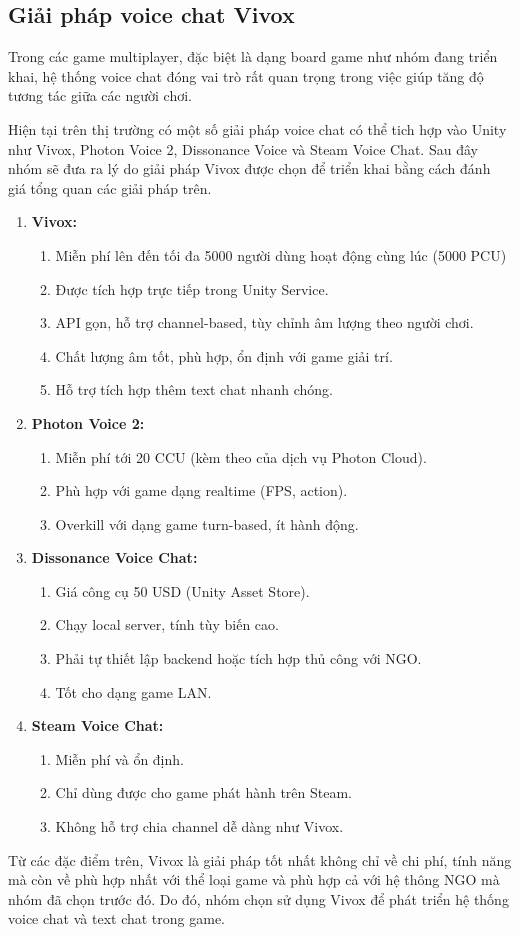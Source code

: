 \subsection{Giải pháp voice chat Vivox}
Trong các game multiplayer, đặc biệt là dạng board game như nhóm đang triển khai, hệ thống voice chat đóng vai trò rất quan trọng trong việc giúp tăng độ tương tác giữa các người chơi.

Hiện tại trên thị trường có một số giải pháp voice chat có thể tich hợp vào Unity như Vivox, Photon Voice 2, Dissonance Voice và Steam Voice Chat. Sau đây nhóm sẽ đưa ra lý do giải pháp Vivox được chọn để triển khai bằng cách đánh giá tổng quan các giải pháp trên.
\begin{enumerate}[$\bullet$]
    \item \textbf{Vivox:}
    \begin{enumerate}[-]
        \item Miễn phí lên đến tối đa 5000 người dùng hoạt động cùng lúc (5000 PCU)
        \item Được tích hợp trực tiếp trong Unity Service.
        \item API gọn, hỗ trợ channel-based, tùy chỉnh âm lượng theo người chơi.
        \item Chất lượng âm tốt, phù hợp, ổn định với game giải trí.
        \item Hỗ trợ tích hợp thêm text chat nhanh chóng.
    \end{enumerate}
    \item \textbf{Photon Voice 2:}
    \begin{enumerate}[-]
        \item Miễn phí tới 20 CCU (kèm theo của dịch vụ Photon Cloud).
        \item Phù hợp với game dạng realtime (FPS, action).
        \item Overkill với dạng game turn-based, ít hành động.
    \end{enumerate}
    \item \textbf{Dissonance Voice Chat:}
    \begin{enumerate}[-]
        \item Giá công cụ 50 USD (Unity Asset Store).
        \item Chạy local server, tính tùy biến cao.
        \item Phải tự thiết lập backend hoặc tích hợp thủ công với NGO.
        \item Tốt cho dạng game LAN.
    \end{enumerate}
    \item \textbf{Steam Voice Chat:}
    \begin{enumerate}[-]
        \item Miễn phí và ổn định.
        \item Chỉ dùng được cho game phát hành trên Steam.
        \item Không hỗ trợ chia channel dễ dàng như Vivox.
    \end{enumerate}
\end{enumerate}

Từ các đặc điểm trên, Vivox là giải pháp tốt nhất không chỉ về chi phí, tính năng mà còn về phù hợp nhất với thể loại game và phù hợp cả với hệ thông NGO mà nhóm đã chọn trước đó. Do đó, nhóm chọn sử dụng Vivox để phát triển hệ thống voice chat và text chat trong game.
